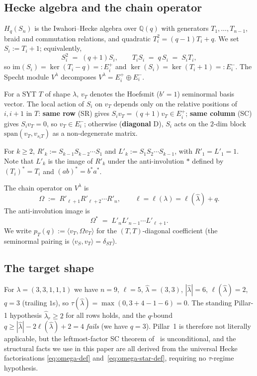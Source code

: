 \documentclass[11pt]{article}
\theoremstyle{definition}
\newcommand{\Hq}{H_q}
\newcommand{\Sn}{S_n}
\newcommand{\Vlam}{V^\lambda}
\newcommand{\Om}{\Omega}
\newcommand{\Omstar}{\Omega^{\ast}}
\newcommand{\hatl}{\widehat\lambda}
\newcommand{\Rp}{{R'}}
\newcommand{\Lp}{{L'}}
\newcommand{\elh}{\ell(\hatl)}
\newcommand{\Eplus}{E^+}
\newcommand{\Eminus}{E^-}
\newcommand{\im}{\mathrm{im}}
\newcommand{\pT}{p_T}
\begin{document}
\subsection{Hecke algebra and the chain operator}

$\Hq(\Sn)$ is the Iwahori--Hecke algebra over $\mathbb{Q}(q)$ with generators
$T_1, \ldots, T_{n-1}$, braid and commutation relations, and quadratic
$T_i^2 = (q-1) T_i + q$. We set $S_i := T_i + 1$; equivalently,
\begin{equation}\label{eq:hecke-abs}
   S_i^2 \;=\; (q+1) S_i, \qquad T_i S_i \;=\; q\,S_i \;=\; S_i T_i,
\end{equation}
so $\im(S_i) = \ker(T_i - q) =: \Eplus_i$ and $\ker(S_i) = \ker(T_i + 1)
=: \Eminus_i$. The Specht module $\Vlam$ decomposes
$\Vlam = \Eplus_i \oplus \Eminus_i$.

For a SYT $T$ of shape $\lambda$, $v_T$ denotes the Hoefsmit ($b'\!=\!1$)
seminormal basis vector. The local action of $S_i$ on $v_T$ depends only on
the relative positions of $i, i+1$ in $T$: \textbf{same row} (SR) gives
$S_i v_T = (q+1) v_T \in \Eplus_i$; \textbf{same column} (SC) gives
$S_i v_T = 0$, so $v_T \in \Eminus_i$; otherwise (\textbf{diagonal} D),
$S_i$ acts on the $2$-dim block $\mathrm{span}(v_T, v_{s_i T})$ as a
non-degenerate matrix.

For $k \ge 2$, $\Rp_k := S_{k-1} S_{k-2} \cdots S_1$ and
$\Lp_k := S_1 S_2 \cdots S_{k-1}$, with $\Rp_1 = \Lp_1 = 1$. Note that
$\Lp_k$ is the image of $\Rp_k$ under the anti-involution $\ast$
defined by $(T_i)^\ast = T_i$ and $(ab)^\ast = b^\ast a^\ast$.

The chain operator on $\Vlam$ is
\begin{equation}\label{eq:omega-def}
   \Om \;:=\; \Rp_{\ell+1} \Rp_{\ell+2} \cdots \Rp_n,
   \qquad \ell = \ell(\lambda) = \elh + q.
\end{equation}
The anti-involution image is
\begin{equation}\label{eq:omega-star-def}
   \Omstar \;=\; \Lp_n \Lp_{n-1} \cdots \Lp_{\ell+1}.
\end{equation}
We write $\pT(q) := \langle v_T, \Om v_T \rangle$ for the $(T,T)$-diagonal
coefficient (the seminormal pairing is $\langle v_S, v_T \rangle =
\delta_{ST}$).

\subsection{The target shape}

For $\lambda = (3,3,1,1,1)$ we have $n = 9$, $\ell = 5$, $\hatl = (3,3)$,
$|\hatl| = 6$, $\elh = 2$, $q = 3$ (trailing $1$s), so
$\tau(\hatl) = \max(0, 3 + 4 - 1 - 6) = 0$. The standing Pillar-1 hypothesis
$\hatl_r \ge 2$ for all rows holds, and the $q$-bound
$q \ge |\hatl| - 2\elh + 2 = 4$ \emph{fails} (we have $q = 3$). Pillar~1 is
therefore not literally applicable, but the leftmost-factor SC theorem
of~\cite{leftmostPerSYT} is unconditional, and the structural facts we use
in this paper are all derived from the universal Hecke factorisations
\eqref{eq:omega-def} and~\eqref{eq:omega-star-def}, requiring no
$\tau$-regime hypothesis.
\end{document}
